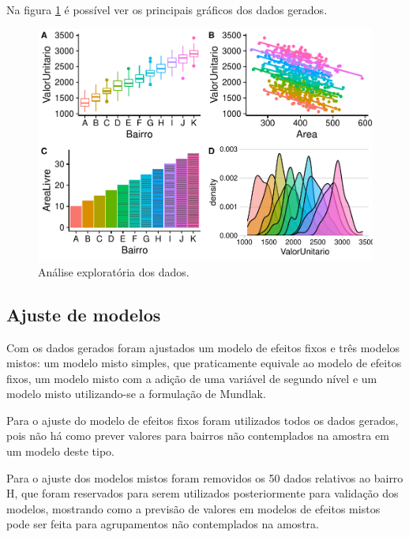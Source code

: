 \documentclass[
  a4paper, 12pt]{article}
\begin{document}
Na figura \ref{fig:exploratoria} é possível ver os principais gráficos
dos dados gerados.

\begin{figure}[H]

{\centering \includegraphics[width=1\linewidth]{EstudoCaso_files/figure-latex/exploratoria-1} 

}

\caption{Análise exploratória dos dados.}\label{fig:exploratoria}
\end{figure}

\hypertarget{ajuste-de-modelos}{%
\subsection{Ajuste de modelos}\label{ajuste-de-modelos}}

Com os dados gerados foram ajustados um modelo de efeitos fixos e três
modelos mistos: um modelo misto simples, que praticamente equivale ao
modelo de efeitos fixos, um modelo misto com a adição de uma variável de
segundo nível e um modelo misto utilizando-se a formulação de Mundlak.

Para o ajuste do modelo de efeitos fixos foram utilizados todos os dados
gerados, pois não há como prever valores para bairros não contemplados
na amostra em um modelo deste tipo.

Para o ajuste dos modelos mistos foram removidos os 50 dados relativos
ao bairro H, que foram reservados para serem utilizados posteriormente
para validação dos modelos, mostrando como a previsão de valores em
modelos de efeitos mistos pode ser feita para agrupamentos não
contemplados na amostra.
\end{document}
